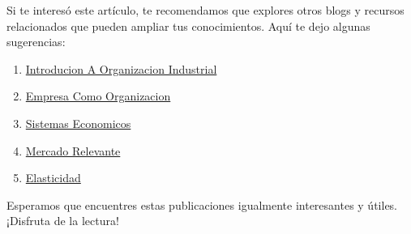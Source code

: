 \documentclass[
  doc,
  floatsintext,
  longtable,
  a4paper,
  nolmodern,
  notxfonts,
  notimes,
  12pt,
  colorlinks=true,linkcolor=blue,citecolor=blue,urlcolor=blue]{apa7}
\providecommand{\tightlist}{%
  \setlength{\itemsep}{0pt}\setlength{\parskip}{0pt}}
\begin{document}
Si te interesó este artículo, te recomendamos que explores otros blogs y
recursos relacionados que pueden ampliar tus conocimientos. Aquí te dejo
algunas sugerencias:

\begin{enumerate}
\def\labelenumi{\arabic{enumi}.}
\tightlist
\item
  \href{https://optimums.netlify.app/organizacion-industrial/2023-06-12-introducion-a-organizacion-industrial/index.pdf}{}
  \href{https://optimums.netlify.app/organizacion-industrial/2023-06-12-introducion-a-organizacion-industrial}{Introducion
  A Organizacion Industrial}
\item
  \href{https://optimums.netlify.app/organizacion-industrial/2023-06-13-empresa-como-organizacion/index.pdf}{}
  \href{https://optimums.netlify.app/organizacion-industrial/2023-06-13-empresa-como-organizacion}{Empresa
  Como Organizacion}
\item
  \href{https://optimums.netlify.app/organizacion-industrial/2023-06-13-sistemas-economicos/index.pdf}{}
  \href{https://optimums.netlify.app/organizacion-industrial/2023-06-13-sistemas-economicos}{Sistemas
  Economicos}
\item
  \href{https://optimums.netlify.app/organizacion-industrial/2023-06-15-mercado-relevante/index.pdf}{}
  \href{https://optimums.netlify.app/organizacion-industrial/2023-06-15-mercado-relevante}{Mercado
  Relevante}
\item
  \href{https://optimums.netlify.app/organizacion-industrial/2023-06-23-elasticidad/index.pdf}{}
  \href{https://optimums.netlify.app/organizacion-industrial/2023-06-23-elasticidad}{Elasticidad}
\end{enumerate}

Esperamos que encuentres estas publicaciones igualmente interesantes y
útiles. ¡Disfruta de la lectura!
\end{document}
